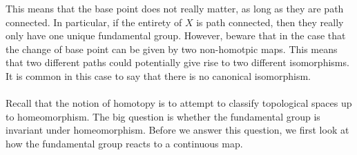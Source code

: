 \documentclass[a4paper]{article}
\begin{document}
This means that the base point does not really matter, as long as they are path connected. In particular, if the entirety of $X$ is path connected, then they really only have one unique fundamental group. However, beware that in the case that the change of base point can be given by two non-homotpic maps. This means that two different paths could potentially give rise to two different isomorphisms. It is common in this case to say that there is no canonical isomorphism. \\~\\

Recall that the notion of homotopy is to attempt to classify topological spaces up to homeomorphism. The big question is whether the fundamental group is invariant under homeomorphism. Before we answer this question, we first look at how the fundamental group reacts to a continuous map. 
\end{document}
